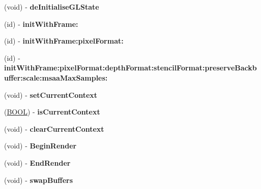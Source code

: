 \begin{DoxyCompactItemize}
\item 
\hypertarget{interface_e_a_g_l_view_a5a32476efbeef3241a173d115716b54e}{(void) -\/ {\bfseries de\+Initialise\+G\+L\+State}}\label{interface_e_a_g_l_view_a5a32476efbeef3241a173d115716b54e}

\item 
\hypertarget{interface_e_a_g_l_view_a78bfbad3ab3a60da454a4b76db073acc}{(id) -\/ {\bfseries init\+With\+Frame\+:}}\label{interface_e_a_g_l_view_a78bfbad3ab3a60da454a4b76db073acc}

\item 
\hypertarget{interface_e_a_g_l_view_ad077ea2ec2ba88da9fac3ef925313482}{(id) -\/ {\bfseries init\+With\+Frame\+:pixel\+Format\+:}}\label{interface_e_a_g_l_view_ad077ea2ec2ba88da9fac3ef925313482}

\item 
\hypertarget{interface_e_a_g_l_view_ac97b73baf3a01c2bae7f76326ab81a93}{(id) -\/ {\bfseries init\+With\+Frame\+:pixel\+Format\+:depth\+Format\+:stencil\+Format\+:preserve\+Backbuffer\+:scale\+:msaa\+Max\+Samples\+:}}\label{interface_e_a_g_l_view_ac97b73baf3a01c2bae7f76326ab81a93}

\item 
\hypertarget{interface_e_a_g_l_view_a7a180c6ef5cbcddf74be6ced6ed91cc0}{(void) -\/ {\bfseries set\+Current\+Context}}\label{interface_e_a_g_l_view_a7a180c6ef5cbcddf74be6ced6ed91cc0}

\item 
\hypertarget{interface_e_a_g_l_view_ab6514f59fa17edd2e7c73a8718869f39}{(\hyperlink{_ice_types_8h_a050c65e107f0c828f856a231f4b4e788}{B\+O\+O\+L}) -\/ {\bfseries is\+Current\+Context}}\label{interface_e_a_g_l_view_ab6514f59fa17edd2e7c73a8718869f39}

\item 
\hypertarget{interface_e_a_g_l_view_a1b05cb2683a0f4316d6ac474b333db01}{(void) -\/ {\bfseries clear\+Current\+Context}}\label{interface_e_a_g_l_view_a1b05cb2683a0f4316d6ac474b333db01}

\item 
\hypertarget{interface_e_a_g_l_view_a953529972b86a3da995438f594a158ba}{(void) -\/ {\bfseries Begin\+Render}}\label{interface_e_a_g_l_view_a953529972b86a3da995438f594a158ba}

\item 
\hypertarget{interface_e_a_g_l_view_a48d7b84825392246761ad2b9171fe70e}{(void) -\/ {\bfseries End\+Render}}\label{interface_e_a_g_l_view_a48d7b84825392246761ad2b9171fe70e}

\item 
\hypertarget{interface_e_a_g_l_view_a9e6bb4e8a5bb54ecffb384abcc154504}{(void) -\/ {\bfseries swap\+Buffers}}\label{interface_e_a_g_l_view_a9e6bb4e8a5bb54ecffb384abcc154504}


\end{DoxyCompactItemize}
